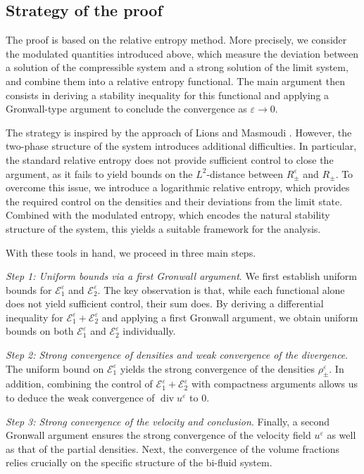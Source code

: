 \documentclass[11pt, twoside, a4paper]{article}
\theoremstyle{plain}
\theoremstyle{remark}
\numberwithin{equation}{section}
\def\EE{{\mathcal E}}
\renewcommand{\div}{\operatorname{div}}
\newcommand{\eps}{\varepsilon}
\begin{document}
\subsection{Strategy of the proof}

The proof is based on the relative entropy method. More precisely, we consider the modulated quantities introduced above, which measure the deviation between a solution of the compressible system and a strong solution of the limit system, and combine them into a relative entropy functional. The main argument then consists in deriving a stability inequality for this functional and applying a Gronwall-type argument to conclude the convergence as $\eps \to 0$.

The strategy is inspired by the approach of Lions and Masmoudi \cite{lions1998incompressible}. However, the two-phase structure of the system introduces additional difficulties. In particular, the standard relative entropy does not provide sufficient control to close the argument, as it fails to yield bounds on the $L^2$-distance between $R_\pm^\eps$ and $R_\pm$. To overcome this issue, we introduce a logarithmic relative entropy, which provides the required control on the densities and their deviations from the limit state. Combined with the modulated entropy, which encodes the natural stability structure of the system, this yields a suitable framework for the analysis. 

With these tools in hand, we proceed in three main steps.

\textit{Step 1: Uniform bounds via a first Gronwall argument}. We first establish uniform bounds for $\EE_1^\eps$ and $\EE_{2}^\eps$. The key observation is that, while each functional alone does not yield sufficient control, their sum does. By deriving a differential inequality for $\EE_1^\eps + \EE_{2}^\eps$ and applying a first Gronwall argument, we obtain uniform bounds on both $\EE_1^\eps$ and $\EE_{2}^\eps$ individually.

\textit{Step 2: Strong convergence of densities and weak convergence of the divergence}. The uniform bound on $\EE_1^\eps$ yields the strong convergence of the densities $\rho_\pm^\eps$. In addition, combining the control of $\EE_1^\eps + \EE_{2}^\eps$ with compactness arguments allows us to deduce the weak convergence of $\div u^\eps$ to $0$.

\textit{Step 3: Strong convergence of the velocity and conclusion}. Finally, a second Gronwall argument ensures the strong convergence of the velocity field $u^\eps$ as well as that of the partial densities. Next, the convergence of the volume fractions relies crucially on the specific structure of the bi-fluid system. 
\end{document}
